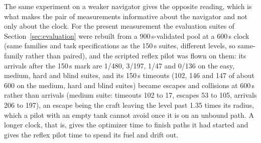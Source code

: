 The same experiment on a weaker navigator gives the opposite reading, which
is what makes the pair of measurements informative about the navigator and
not only about the clock. For the present measurement the evaluation suites of
Section~\ref{sec:evaluation} were rebuilt from a
900\,s-validated pool at a 600\,s clock (same families and task
specifications as the 150\,s suites, different levels, so same-family rather
than paired), and the scripted reflex pilot was flown on them: its arrivals
after the 150\,s mark are 1/480, 3/197, 1/47 and 0/136 on the easy, medium,
hard and blind suites, and its 150\,s timeouts (102, 146 and 147 of about
600 on the medium, hard and blind suites) became escapes and collisions at
600\,s rather than arrivals (medium suite: timeouts 102 to 17, escapes 53 to
105, arrivals 206 to 197), an escape being the craft leaving the level past
1.35 times its radius, which a pilot with an empty tank cannot avoid once it
is on an unbound path. A longer clock, that is, gives the optimizer time to finish paths it had
started and gives the reflex pilot time to spend its fuel and drift out.

